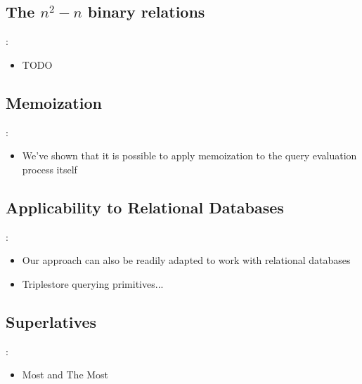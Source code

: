 \documentclass[logoontitle,tabu,supertabular,aspectratio=43]{preney-uwindsor-beamer}
\begin{document}
    \subsection{The $n^2 - n$ binary relations}
    \begin{frame}{\insertsection: \insertsubsection}
    \begin{itemize}
            \item TODO %
    \end{itemize}
    \end{frame}

    \subsection{Memoization}
    \begin{frame}{\insertsection: \insertsubsection}
    \begin{itemize}
        \item We've shown that it is possible to apply memoization to the query evaluation process itself
    \end{itemize}
    \end{frame}

    \subsection{Applicability to Relational Databases}
    \begin{frame}{\insertsection: \insertsubsection}
    \begin{itemize}
        \item Our approach can also be readily adapted to work with relational databases
        \item Triplestore querying primitives...
    \end{itemize}
    \end{frame}

    \subsection{Superlatives}
    \begin{frame}{\insertsection: \insertsubsection}
        \begin{itemize}
            \item Most and The Most
        \end{itemize}
    \end{frame}
\end{document}
